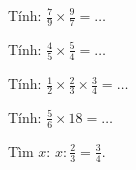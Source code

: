 \begin{ex}
Tính: $\frac{7}{9} \times \frac{9}{7} = \dots$
\end{ex}

\begin{ex}
Tính: $\frac{4}{5} \times \frac{5}{4} = \dots$
\end{ex}

\begin{ex}
Tính: $\frac{1}{2} \times \frac{2}{3} \times \frac{3}{4} = \dots$
\end{ex}

\begin{ex}
Tính: $\frac{5}{6} \times 18 = \dots$
\end{ex}

\begin{ex}
Tìm $x$: $x : \frac{2}{3} = \frac{3}{4}$.
\end{ex}
